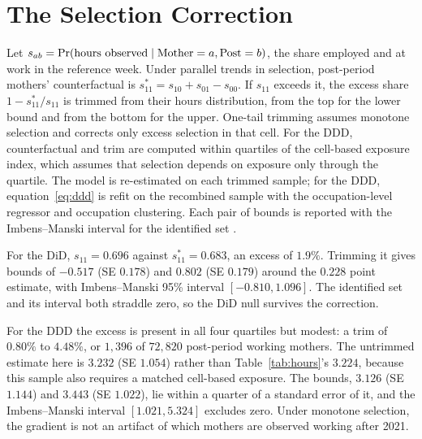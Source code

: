 \section{The Selection Correction}\label{sec:app-lee}

Let $s_{ab} = \Pr(\text{hours observed} \mid \text{Mother}=a, \text{Post}=b)$, the share employed and at
work in the reference week. Under parallel trends in selection, post-period mothers'
counterfactual is $s^*_{11} = s_{10} + s_{01} - s_{00}$. If $s_{11}$ exceeds it, the excess
share $1 - s^*_{11}/s_{11}$ is trimmed from their hours distribution, from the top for the
lower bound and from the bottom for the upper. One-tail trimming assumes monotone selection and
corrects only excess selection in that cell. For the DDD, counterfactual and trim are computed
within quartiles of the cell-based exposure index, which assumes that selection depends on
exposure only through the quartile. The model is re-estimated on each trimmed sample; for the
DDD, equation~\eqref{eq:ddd} is refit on the recombined sample with the occupation-level
regressor and occupation clustering. Each pair of bounds is reported with the Imbens--Manski
interval for the identified set \citep{imbens2004}.

For the DiD, $s_{11} = 0.696$ against $s^*_{11} = 0.683$, an excess of $1.9\%$. Trimming it
gives bounds of $-0.517$ (SE $0.178$) and $0.802$ (SE $0.179$) around the $0.228$ point
estimate, with Imbens--Manski 95\% interval $[-0.810, 1.096]$. The identified set and its
interval both straddle zero, so the DiD null survives the correction.

For the DDD the excess is present in all four quartiles but modest: a trim of $0.80\%$ to
$4.48\%$, or $1{,}396$ of $72{,}820$ post-period working mothers. The untrimmed estimate here
is $3.232$ (SE $1.054$) rather than Table~\ref{tab:hours}'s $3.224$, because this sample also
requires a matched cell-based exposure. The bounds, $3.126$ (SE $1.144$) and $3.443$
(SE $1.022$), lie within a quarter of a standard error of it, and the Imbens--Manski interval
$[1.021, 5.324]$ excludes zero. Under monotone selection, the gradient is not an artifact of
which mothers are observed working after 2021.

